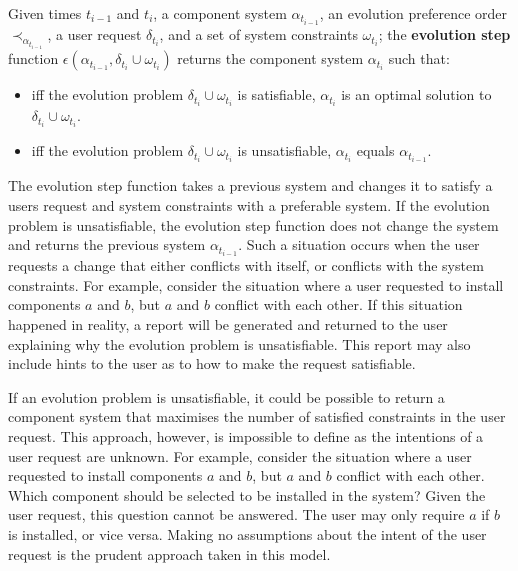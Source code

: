 \begin{defs}
\label{formal.stepdef}
Given times $t_{i-1}$ and $t_i$, a component system $\alpha_{t_{i-1}}$, an evolution preference order $\prec_{\alpha_{t_{i-1}}}$, 
a user request $\delta_{t_i}$, and a set of system constraints $\omega_{t_i}$;
the \textbf{evolution step} function  $\epsilon(\alpha_{t_{i-1}},\delta_{t_i} \cup \omega_{t_i})$ returns the component system $\alpha_{t_i}$ such that:
\begin{itemize}
  \item iff the evolution problem $\delta_{t_i} \cup \omega_{t_i}$ is satisfiable, $\alpha_{t_i}$ is an optimal solution to $\delta_{t_i} \cup \omega_{t_i}$.
  \item iff the evolution problem $\delta_{t_i} \cup \omega_{t_i}$ is unsatisfiable, $\alpha_{t_i}$ equals $\alpha_{t_{i-1}}$.
\end{itemize}
\end{defs}
The evolution step function takes a previous system and changes it to satisfy a users request and system constraints with a preferable system.
If the evolution problem is unsatisfiable, the evolution step function does not change the system and returns the previous system $\alpha_{t_{i-1}}$.
Such a situation occurs when the user requests a change that either conflicts with itself, or conflicts with the system constraints.
For example, consider the situation where a user requested to install components $a$ and $b$, but $a$ and $b$ conflict with each other.
If this situation happened in reality, a report will be generated and returned to the user explaining why the evolution problem is unsatisfiable.
This report may also include hints to the user as to how to make the request satisfiable.

If an evolution problem is unsatisfiable, it could be possible to return a component system that maximises the number of satisfied constraints in the user request.
This approach, however, is impossible to define as the intentions of a user request are unknown.
For example, consider the situation where a user requested to install components $a$ and $b$, but $a$ and $b$ conflict with each other.
Which component should be selected to be installed in the system?
Given the user request, this question cannot be answered.
The user may only require $a$ if $b$ is installed, or vice versa.
Making no assumptions about the intent of the user request is the prudent approach taken in this model.

